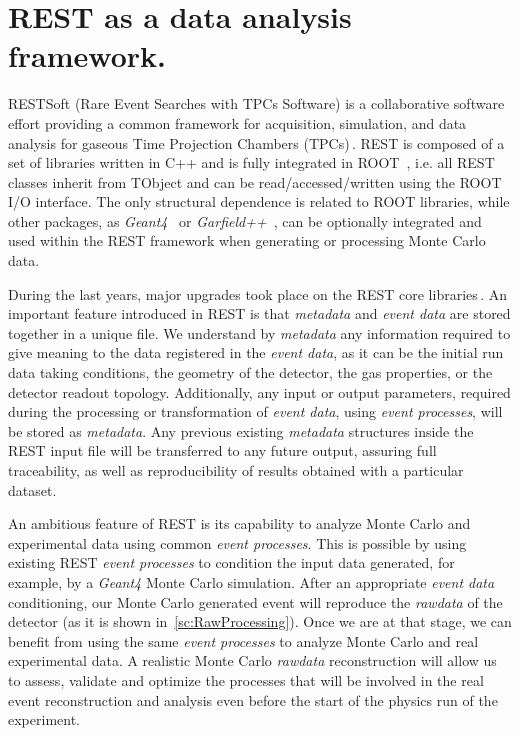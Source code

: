 \section{REST as a data analysis framework.}\label{sc:REST}

RESTSoft (Rare Event Searches with TPCs Software) is a collaborative software effort providing a common framework for acquisition, simulation, and data analysis for gaseous Time Projection Chambers (TPCs)\,\cite{tomas2013development}. REST is composed of a set of libraries written in C++ and is fully integrated in ROOT~\cite{ROOT}, i.e. all REST classes inherit from TObject and can be read/accessed/written using the ROOT I/O interface. The only structural dependence is related to ROOT libraries, while other packages, as \emph{Geant4}~\cite{Agostinelli:2002hh} or \emph{Garfield++}~\cite{Garfield}, can be optionally integrated and used within the REST framework when generating or processing Monte Carlo data.

During the last years, major upgrades took place on the REST core libraries\,\cite{Galan_8thTPC}. An important feature introduced in REST is that \emph{metadata} and \emph{event data} are stored together in a unique file. We understand by \emph{metadata} any information required to give meaning to the data registered in the \emph{event data}, as it can be the initial run data taking conditions, the geometry of the detector, the gas properties, or the detector readout topology. Additionally, any input or output parameters, required during the processing or transformation of \emph{event data}, using \emph{event processes}, will be stored as \emph{metadata}. Any previous existing \emph{metadata} structures inside the REST input file will be transferred to any future output, assuring full traceability, as well as reproducibility of results obtained with a particular dataset.

An ambitious feature of REST is its capability to analyze Monte Carlo and experimental data using common \emph{event processes}. This is possible by using existing REST \emph{event processes} to condition the input data generated, for example, by a \emph{Geant4} Monte Carlo simulation. After an appropriate \emph{event data} conditioning, our Monte Carlo generated event will reproduce the \emph{rawdata} of the detector (as it is shown in~\ref{sc:RawProcessing}). Once we are at that stage, we can benefit from using the same \emph{event processes} to analyze Monte Carlo and real experimental data. A realistic Monte Carlo \emph{rawdata} reconstruction will allow us to assess, validate and optimize the processes that will be involved in the real event reconstruction and analysis even before the start of the physics run of the experiment.

